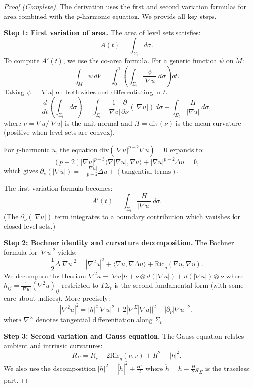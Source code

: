 \documentclass[12pt]{article}
\theoremstyle{plain}
\theoremstyle{definition}
\theoremstyle{remark}
\newcommand{\Ric}{\mathrm{Ric}}
\newcommand{\Div}{\mathrm{div}}
\newcommand{\tM}{\tilde{M}}
\newcommand{\tg}{\tilde{g}}
\begin{document}
\begin{proof}[Proof (Complete)]
The derivation uses the first and second variation formulas for area combined with the $p$-harmonic equation. We provide all key steps.

\textbf{Step 1: First variation of area.}
The area of level sets satisfies:
\[
A(t) = \int_{\Sigma_t} d\sigma.
\]
To compute $A'(t)$, we use the co-area formula. For a generic function $\psi$ on $\tM$:
\[
\int_{\tM} \psi \, dV = \int_0^1 \left(\int_{\Sigma_t} \frac{\psi}{|\nabla u|} \, d\sigma\right) dt.
\]
Taking $\psi = |\nabla u|$ on both sides and differentiating in $t$:
\[
\frac{d}{dt}\left(\int_{\Sigma_t} d\sigma\right) = \int_{\Sigma_t} \frac{1}{|\nabla u|} \frac{\partial}{\partial \nu}(|\nabla u|) \, d\sigma + \int_{\Sigma_t} \frac{H}{|\nabla u|} \, d\sigma,
\]
where $\nu = \nabla u/|\nabla u|$ is the unit normal and $H = \Div(\nu)$ is the mean curvature (positive when level sets are convex).

For $p$-harmonic $u$, the equation $\Div(|\nabla u|^{p-2}\nabla u) = 0$ expands to:
\begin{equation}\label{eq:p-harmonic-expanded}
(p-2)|\nabla u|^{p-3}\langle \nabla|\nabla u|, \nabla u\rangle + |\nabla u|^{p-2}\Delta u = 0,
\end{equation}
which gives $\partial_\nu(|\nabla u|) = -\frac{|\nabla u|}{p-2}\Delta u + (\text{tangential terms})$.

The first variation formula becomes:
\begin{equation}\label{eq:first-variation-area}
A'(t) = \int_{\Sigma_t} \frac{H}{|\nabla u|} \, d\sigma.
\end{equation}
(The $\partial_\nu(|\nabla u|)$ term integrates to a boundary contribution which vanishes for closed level sets.)

\textbf{Step 2: Bochner identity and curvature decomposition.}
The Bochner formula for $|\nabla u|^2$ yields:
\[
\frac{1}{2}\Delta|\nabla u|^2 = |\nabla^2 u|^2 + \langle \nabla u, \nabla\Delta u\rangle + \Ric_{\tg}(\nabla u, \nabla u).
\]
We decompose the Hessian: $\nabla^2 u = |\nabla u| h + \nu \otimes d(|\nabla u|) + d(|\nabla u|) \otimes \nu$ where $h_{ij} = \frac{1}{|\nabla u|}(\nabla^2 u)_{ij}$ restricted to $T\Sigma_t$ is the second fundamental form (with some care about indices). More precisely:
\[
|\nabla^2 u|^2 = |h|^2 |\nabla u|^2 + 2|\nabla^\Sigma |\nabla u||^2 + |\partial_\nu |\nabla u||^2,
\]
where $\nabla^\Sigma$ denotes tangential differentiation along $\Sigma_t$.

\textbf{Step 3: Second variation and Gauss equation.}
The Gauss equation relates ambient and intrinsic curvatures:
\[
R_\Sigma = R_{\tg} - 2\Ric_{\tg}(\nu, \nu) + H^2 - |h|^2.
\]
We also use the decomposition $|h|^2 = |\mathring{h}|^2 + \frac{H^2}{2}$ where $\mathring{h} = h - \frac{H}{2}g_\Sigma$ is the traceless part.


\end{proof}
\end{document}
